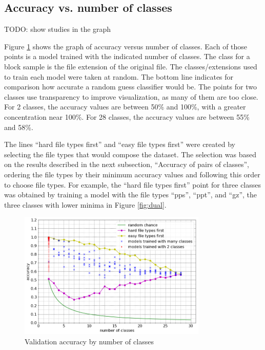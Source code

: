 \subsection{Accuracy vs. number of classes}

TODO: show studies in the graph

Figure \ref{fig:nclasses} shows the graph of accuracy versus number of classes.  Each of those points is a model trained with the indicated number of classes. The class for a block sample is the file extension of the original file. The classes/extensions used to train each model were taken at random. The bottom line indicates for comparison how accurate a random guess classifier would be. The points for two classes use transparency to improve visualization, as many of them are too close. For 2 classes, the accuracy values are between 50\% and 100\%, with a greater concentration near 100\%. For 28 classes, the accuracy values are between 55\% and 58\%.

The lines ``hard file types first'' and ``easy file types first'' were created by selecting the file types that would compose the dataset. The selection was based on the results described in the next subsection, ``Accuracy of pairs of classes'', ordering the file types by their minimum accuracy values and following this order to choose file types. For example, the ``hard file types first'' point for three classes was obtained by training a model with the file types ``pps'', ``ppt'', and ``gz'', the three classes with lower minima in Figure \ref{fig:dual}.

\noindent
\begin{figure}[htb!]
\centering\includegraphics[width=0.8\textwidth]{nclasses.png}
\caption{\label{fig:nclasses}Validation accuracy by number of classes}%
\end{figure}

